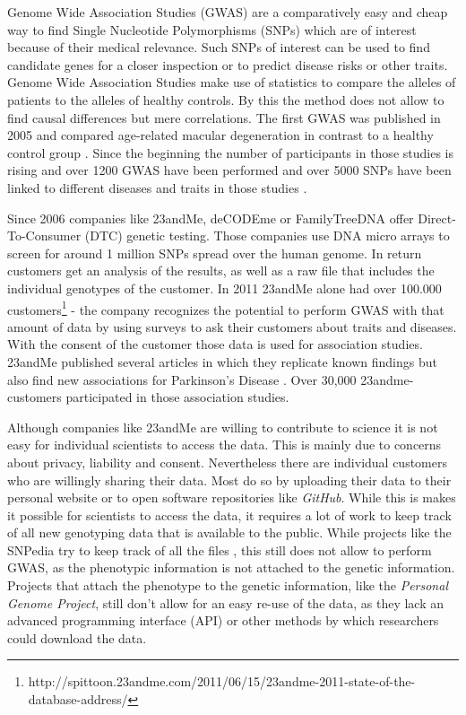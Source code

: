 \documentclass[10pt]{article}
\begin{document}
Genome Wide Association Studies (GWAS) are a comparatively easy and cheap way to find Single Nucleotide Polymorphisms (SNPs) which are of interest because of their medical relevance. Such SNPs of interest can be used to find candidate genes for a closer inspection or to predict disease risks or other traits. Genome Wide Association Studies make use of statistics to compare the alleles of patients to the alleles of healthy controls. By this the method does not allow to find causal differences but mere correlations. The first GWAS was published in 2005 and compared age-related macular degeneration in contrast to a healthy control group \cite{Klein2005}. Since the beginning the number of participants in those studies is rising and over 1200 GWAS have been performed \cite{Johnson2009} and over 5000 SNPs have been linked to different diseases and traits in those studies \cite{Hindorff2009}. %

Since 2006 companies like 23andMe, deCODEme or FamilyTreeDNA offer Direct-To-Consumer (DTC) genetic testing. Those companies use DNA micro arrays to screen for around 1 million SNPs spread over the human genome. In return customers get an analysis of the results, as well as a raw file that includes the individual genotypes of the customer. In 2011 23andMe alone had over 100.000 customers\footnote{http://spittoon.23andme.com/2011/06/15/23andme-2011-state-of-the-database-address/} - the company recognizes the potential to perform GWAS with that amount of data by using surveys to ask their customers about traits and diseases. With the consent of the customer those data is used for association studies. 23andMe published several articles in which they replicate known findings but also find new associations for Parkinson's Disease \cite{Eriksson2010, Do2011}. Over 30,000 23andme-customers participated in those association studies.  

Although companies like 23andMe are willing to contribute to science it is not easy for individual scientists to access the data. This is mainly due to concerns about privacy, liability and consent. Nevertheless there are individual customers who are willingly sharing their data. Most do so by uploading their data to their personal website or to open software repositories like \textit{GitHub}. While this is makes it possible for scientists to access the data, it requires a lot of work to keep track of all new genotyping data that is available to the public. While projects like the SNPedia try to keep track of all the files \cite{Cariaso2011}, this still does not allow to perform GWAS, as the phenotypic information is not attached to the genetic information. Projects that attach the phenotype to the genetic information, like the \textit{Personal Genome Project}, still don't allow for an easy re-use of the data, as they lack an advanced programming interface (API) or other methods by which researchers could download the data.  
\end{document}
